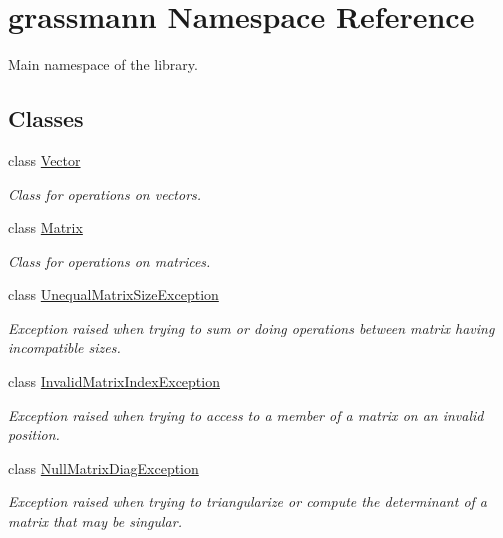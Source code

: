 \hypertarget{namespacegrassmann}{
\section{grassmann Namespace Reference}
\label{namespacegrassmann}
}
Main namespace of the library.  


\subsection*{Classes}
\begin{CompactItemize}
\item 
class \hyperlink{classgrassmann_1_1Vector}{Vector}
\begin{CompactList}\small\item\em Class for operations on vectors. \item\end{CompactList}\item 
class \hyperlink{classgrassmann_1_1Matrix}{Matrix}
\begin{CompactList}\small\item\em Class for operations on matrices. \item\end{CompactList}\item 
class \hyperlink{classgrassmann_1_1UnequalMatrixSizeException}{UnequalMatrixSizeException}
\begin{CompactList}\small\item\em Exception raised when trying to sum or doing operations between matrix having incompatible sizes. \item\end{CompactList}\item 
class \hyperlink{classgrassmann_1_1InvalidMatrixIndexException}{InvalidMatrixIndexException}
\begin{CompactList}\small\item\em Exception raised when trying to access to a member of a matrix on an invalid position. \item\end{CompactList}\item 
class \hyperlink{classgrassmann_1_1NullMatrixDiagException}{NullMatrixDiagException}
\begin{CompactList}\small\item\em Exception raised when trying to triangularize or compute the determinant of a matrix that may be singular. \item\end{CompactList}\item 

\end{CompactItemize}
